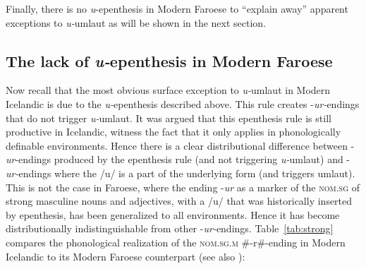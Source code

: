 \documentclass[output=paper,
modfonts
]{LSP/langsci}
\begin{document}
\begin{exe}
Finally, there is no \emph{u}-epenthesis in Modern Faroese to ``explain
away'' apparent exceptions to \emph{u-}umlaut as will be shown in the
next section.

\subsection{The lack of \emph{u-}epenthesis in Modern Faroese}

Now recall that the most obvious surface exception to \emph{u-}umlaut in
Modern Icelandic is due to the \emph{u-}epenthesis described above. This
rule creates -\emph{ur-}endings that do not trigger \emph{u-}umlaut. It
was argued that this epenthesis rule is still productive in Icelandic,
witness the fact that it only applies in phonologically definable
environments. Hence there is a clear distributional difference between
-\emph{ur}-endings produced by the epenthesis rule (and not triggering
\emph{u-}umlaut) and -\emph{ur-}endings where the /u/ is a part of the
underlying form (and triggers umlaut). This is not the case in Faroese,
where the ending -\emph{ur} as a marker of the \textsc{nom.sg} of strong
masculine nouns and adjectives, with a /u/ that was historically
inserted by epenthesis, has been generalized to all environments. Hence
it has become distributionally indistinguishable from other
-\emph{ur-}endings. Table~\ref{tab:strong} compares the phonological realization of the
\textsc{nom.sg.m} \#-r\#-ending in Modern Icelandic to its Modern
Faroese counterpart (see also \citealt[100]{thrainsson2011}):


\end{exe}
\end{document}
